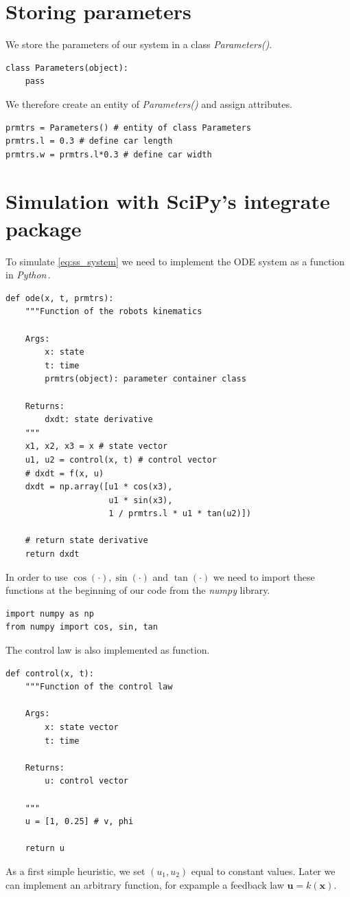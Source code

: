 \documentclass[a4paper,11pt,headings=standardclasses]{scrartcl}%
\newcommand{\py}{\emph{Python}\,}
\begin{document}
\section{Storing parameters}
We store the parameters of our system in a class \emph{Parameters()}.
\begin{lstlisting}
class Parameters(object):
    pass
\end{lstlisting}
We therefore create an entity of \emph{Parameters()} and assign attributes.
\begin{lstlisting}
prmtrs = Parameters() # entity of class Parameters
prmtrs.l = 0.3 # define car length
prmtrs.w = prmtrs.l*0.3 # define car width
\end{lstlisting}
\section{Simulation with SciPy's integrate package}
\label{sec:simulation}
To simulate \eqref{eq:ss_system} we need to implement the ODE system as a function in \py.
\begin{lstlisting}
def ode(x, t, prmtrs):
    """Function of the robots kinematics

    Args:
        x: state
        t: time
        prmtrs(object): parameter container class

    Returns:
        dxdt: state derivative
    """
    x1, x2, x3 = x # state vector
    u1, u2 = control(x, t) # control vector
    # dxdt = f(x, u)
    dxdt = np.array([u1 * cos(x3),
                     u1 * sin(x3),
                     1 / prmtrs.l * u1 * tan(u2)])

    # return state derivative
    return dxdt
\end{lstlisting}
In order to use $\cos(\cdot), \sin(\cdot)$ and $\tan(\cdot)$ we need to import these functions at the beginning of our code from the \emph{numpy} library.
\begin{lstlisting}
import numpy as np 
from numpy import cos, sin, tan
\end{lstlisting}
The control law is also implemented as function.
\begin{lstlisting}
def control(x, t):
    """Function of the control law

    Args:
        x: state vector
        t: time

    Returns:
        u: control vector

    """
    u = [1, 0.25] # v, phi
    
    return u
\end{lstlisting}
As a first simple heuristic, we set $(u_1, u_2)$ equal to constant values. Later we can implement an arbitrary function, for expample a feedback law $\mathbf{u}=k(\mathbf{x})$.
\end{document}
